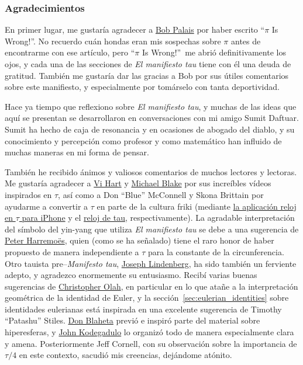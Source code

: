 
  \subsubsection{Agradecimientos} %
  \label{sec:acknowledgments}

En primer lugar, me gustaría agradecer a \href{http://www.math.utah.edu/~palais}{Bob Palais} por haber escrito ``$\pi$ Is Wrong!''. No recuerdo cuán hondas eran mis sospechas sobre $\pi$ antes de encontrarme con ese artículo, pero ``$\pi$ Is Wrong!''\ me abrió definitivamente los ojos, y cada una de las secciones de \emph{El manifiesto tau} tiene con él una deuda de gratitud. También me gustaría dar las gracias a Bob por sus útiles comentarios sobre este manifiesto, y especialmente por tomárselo con tanta deportividad.

Hace ya tiempo que reflexiono sobre \emph{El manifiesto tau}, y muchas de las ideas que aquí se presentan se desarrollaron en conversaciones con mi amigo Sumit Daftuar. 
Sumit ha hecho de caja de resonancia y en ocasiones de abogado del diablo, y su conocimiento y percepción como profesor y como matemático  han influido de muchas maneras en mi forma de pensar.

También he recibido ánimos y valiosos comentarios de muchos lectores y lectoras. Me gustaría agradecer a \href{http://www.youtube.com/watch?v=jG7vhMMXagQ}{Vi Hart} y \href{http://www.youtube.com/watch?v=3174T-3-59Q}{Michael Blake} por sus increíbles vídeos inspirados en $\tau$, así como a Don ``Blue'' McConnell y Skona Brittain por ayudarme a convertir a $\tau$ en parte de la cultura friki (mediante \href{http://tauclock.com/}{la aplicación reloj en $\tau$ para iPhone} y el \href{http://www.sbcrafts.net/clocks/}{reloj de tau}, respectivamente). La agradable interpretación del símbolo del yin-yang que utiliza \emph{El manifiesto tau} se debe a una sugerencia de \href{http://www.harremoes.dk/Peter/}{Peter Harremo\"{e}s}, quien (como se ha señalado) tiene el raro honor de haber propuesto de manera independiente a $\tau$ para la constante de la circunferencia. Otro tauista pre--\emph{Manifesto tau}, \href{https://sites.google.com/site/taubeforeitwascool/}{Joseph Lindenberg}, ha sido también un ferviente adepto, y agradezco enormemente su entusiasmo. Recibí varias buenas sugerencias de \href{http://christopherolah.wordpress.com/about-me}{Christopher Olah}, en particular en lo que atañe a la interpretación geométrica de la identidad de Euler, y la sección~\ref{sec:eulerian_identities} sobre identidades eulerianas está inspirada en una excelente sugerencia de Timothy ``Patashu'' Stiles. \href{http://www.blahedo.org/blog/archives/001083.html}{Don Blaheta} previó e inspiró parte del material sobre hiperesferas, y \href{http://spikedmath.com/forum/viewtopic.php?f=30&t=147\#p1577}{John Kodegadulo} lo organizó todo de manera especialmente clara y amena. Posteriormente Jeff Cornell, con su observación sobre la importancia de $\tau/4$ en este contexto, sacudió mis creencias, dejándome atónito.

